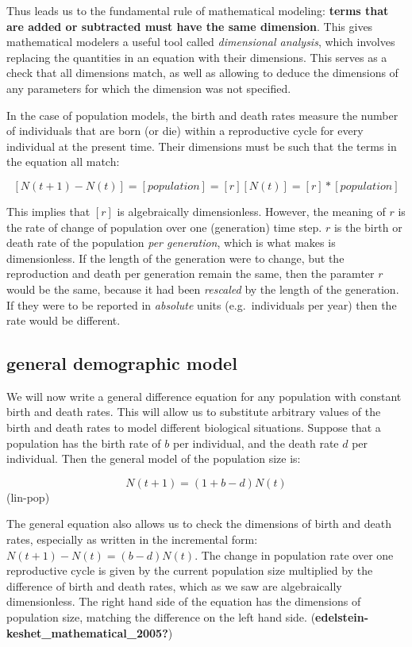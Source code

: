 \documentclass[
  letterpaper,
  DIV=11,
  numbers=noendperiod]{scrreprt}
\begin{document}
Thus leads us to the fundamental rule of mathematical modeling:
\textbf{terms that are added or subtracted must have the same
dimension}. This gives mathematical modelers a useful tool called
\emph{dimensional analysis}, which involves replacing the quantities in
an equation with their dimensions. This serves as a check that all
dimensions match, as well as allowing to deduce the dimensions of any
parameters for which the dimension was not specified.

In the case of population models, the birth and death rates measure the
number of individuals that are born (or die) within a reproductive cycle
for every individual at the present time. Their dimensions must be such
that the terms in the equation all match:

\[
[N(t+1) - N(t)] = [population] = [r] [N(t)] = [r] *[population]
\]

This implies that \([r]\) is algebraically dimensionless. However, the
meaning of \(r\) is the rate of change of population over one
(generation) time step. \(r\) is the birth or death rate of the
population \emph{per generation}, which is what makes is dimensionless.
If the length of the generation were to change, but the reproduction and
death per generation remain the same, then the paramter \(r\) would be
the same, because it had been \emph{rescaled} by the length of the
generation. If they were to be reported in \emph{absolute} units
(e.g.~individuals per year) then the rate would be different.

\hypertarget{general-demographic-model}{%
\subsection{general demographic model}\label{general-demographic-model}}

We will now write a general difference equation for any population with
constant birth and death rates. This will allow us to substitute
arbitrary values of the birth and death rates to model different
biological situations. Suppose that a population has the birth rate of
\(b\) per individual, and the death rate \(d\) per individual. Then the
general model of the population size is:

\[
N(t+1) = (1 + b - d)N(t)
\] (lin-pop)

The general equation also allows us to check the dimensions of birth and
death rates, especially as written in the incremental form:
\(N(t+1) - N(t) = (b - d)N(t)\). The change in population rate over one
reproductive cycle is given by the current population size multiplied by
the difference of birth and death rates, which as we saw are
algebraically dimensionless. The right hand side of the equation has the
dimensions of population size, matching the difference on the left hand
side. (\textbf{edelstein-keshet\_mathematical\_2005?})
\end{document}
